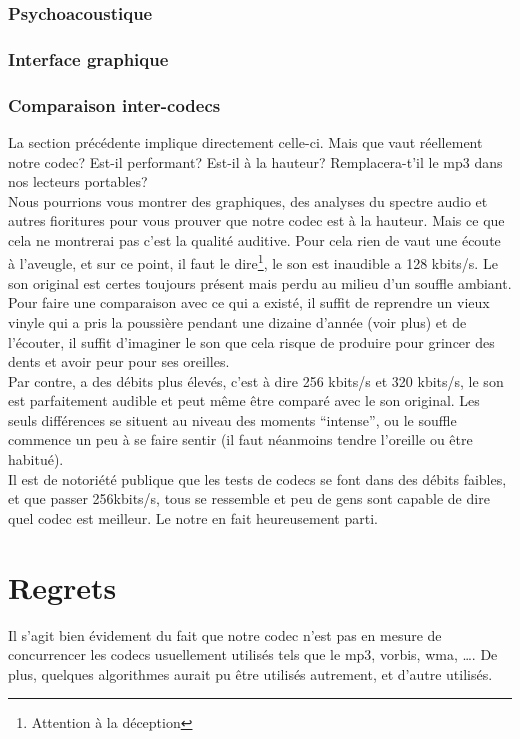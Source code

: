 \documentclass[a4paper,12pt]{report}
\begin{document}
\subsection{Psychoacoustique}
\subsection{Interface graphique}
\subsection{Comparaison inter-codecs}
La section précédente implique directement celle-ci. Mais que vaut réellement
notre codec? Est-il performant? Est-il à la hauteur? Remplacera-t'il le mp3 dans
nos lecteurs portables?\\
Nous pourrions vous montrer des graphiques, des analyses du spectre audio et
autres fioritures pour vous prouver que notre codec est à la hauteur. Mais ce
que cela ne montrerai pas c'est la qualité auditive. Pour cela rien de vaut une
écoute à l'aveugle, et sur ce point, il faut le dire\footnote{Attention à la
déception}, le son est inaudible a 128 kbits/s. Le son original est certes
toujours présent mais perdu au milieu d'un souffle ambiant. Pour faire une
comparaison avec ce qui a existé, il suffit de reprendre un vieux vinyle qui a
pris la poussière pendant une dizaine d'année (voir plus) et de l'écouter, il
suffit d'imaginer le son que cela risque de produire pour grincer des dents et
avoir peur pour ses oreilles.\\
Par contre, a des débits plus élevés, c'est à dire 256 kbits/s et 320 kbits/s,
le son est parfaitement audible et peut même être comparé avec le son original.
Les seuls différences se situent au niveau des moments ``intense'', ou le
souffle commence un peu à se faire sentir (il faut néanmoins tendre l'oreille ou
être habitué).\\
Il est de notoriété publique que les tests de codecs se font dans des débits
faibles, et que passer 256kbits/s, tous se ressemble et peu de gens sont capable
de dire quel codec est meilleur. Le notre en fait heureusement parti.
\chapter{Regrets}
Il s'agit bien évidement du fait que notre codec n'est pas en mesure de
concurrencer les codecs usuellement utilisés tels que le mp3, vorbis, wma, \ldots.
De plus, quelques algorithmes aurait pu être utilisés autrement, et d'autre
utilisés.\\
\end{document}
